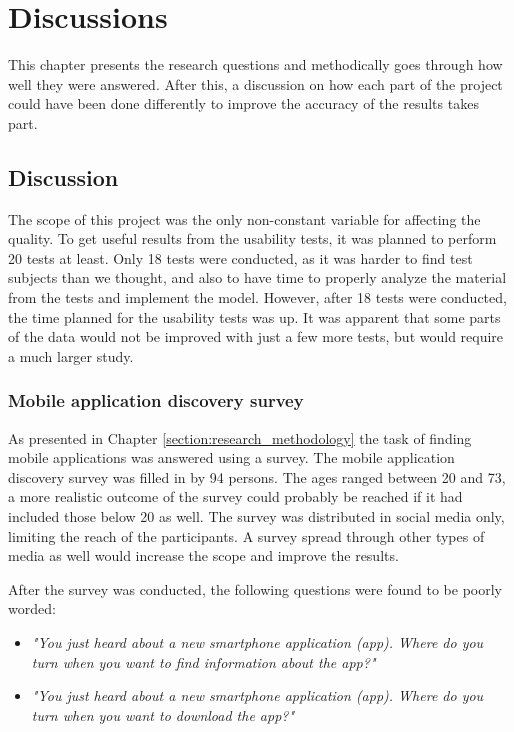 \section{ Discussions }

This chapter presents the research questions and methodically goes through how well they were answered. After this, a discussion on how each part of the project could have been done differently to improve the accuracy of the results takes part. 

\subsection{Discussion}

The scope of this project was the only non-constant variable for affecting the quality. To get useful results from the usability tests, it was planned to perform 20 tests at least. Only 18 tests were conducted, as it was harder to find test subjects than we thought, and also to have time to properly analyze the material from the tests and implement the model. However, after 18 tests were conducted, the time planned for the usability tests was up. It was apparent that some parts of the data would not be improved with just a few more tests, but would require a much larger study. 

\subsubsection{Mobile application discovery survey}

As presented in Chapter \ref{section:research_methodology} the task of finding mobile applications was answered using a survey. The mobile application discovery survey was filled in by 94 persons. The ages ranged between 20 and 73, a more realistic outcome of the survey could probably be reached if it had included those below 20 as well. The survey was distributed in social media only, limiting the reach of the participants. A survey spread through other types of media as well would increase the scope and improve the results. 

After the survey was conducted, the following questions were found to be poorly worded:

\begin{itemize}
    \item \textit{"You just heard about a new smartphone application (app). Where do you turn when you want to find information about the app?"}
    \item \textit{"You just heard about a new smartphone application (app). Where do you turn when you want to download the app?"}
\end{itemize}

